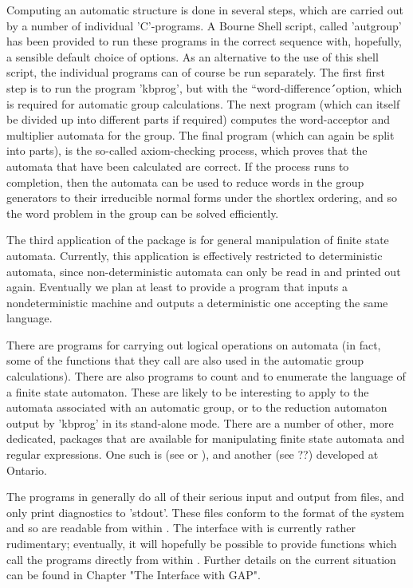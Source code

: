 Computing an automatic structure is done in several steps, which are
carried out by a number of individual 'C'-programs. A Bourne Shell script,
called 'autgroup' has been provided to run these programs in the correct
sequence with, hopefully, a sensible default choice of options. As an
alternative to the use of this shell script, the individual programs can of
course be run separately. The first first step is to run the program
'kbprog', but with the ``word-difference\'\'\ option, which is required
for automatic group calculations. The next program (which can itself be
divided up into different parts if required) computes the word-acceptor
and multiplier automata for the group. The final program (which can again
be split into parts), is the so-called axiom-checking process, which proves
that the automata that have been calculated are correct.
If the process runs to completion, then the automata can be used to reduce
words in the group generators to their irreducible normal forms under the
shortlex ordering, and so the word problem in the group can be solved
efficiently.

The third application of the package is for general manipulation of finite
state automata. Currently, this application is effectively restricted to
deterministic automata, since non-deterministic automata can only be read in and
printed out again. Eventually we plan at least to provide a program that
inputs a nondeterministic machine and outputs a deterministic one accepting
the same language.

There are programs for carrying out logical operations
on automata (in fact, some of the functions that they call are also used
in the automatic group calculations).  There are also programs to count
and to enumerate the language of a finite state automaton. These are
likely to be interesting to apply to the automata associated with
an automatic group, or to the reduction automaton output by 'kbprog' in
its stand-alone mode. There are a number of other, more dedicated,
packages that are available for manipulating finite state automata and
regular expressions. One such is {\Automate} (see \cite{Rie87} or
\cite{ChH91}), and another {\Grail} (see ??) developed at Ontario.

The programs in {\KBMAG} generally do all of their serious input and output
from files, and only print diagnostics to 'stdout'. These files conform to
the format of the  {\GAP} system \cite{Sch92} and so are readable from
within {\GAP}. The interface with {\GAP} is currently rather rudimentary;
eventually, it will hopefully be possible to provide {\GAP} functions which
call the {\KBMAG} programs directly from within {\GAP}. Further details on
the current situation can be found in Chapter "The Interface with GAP".

